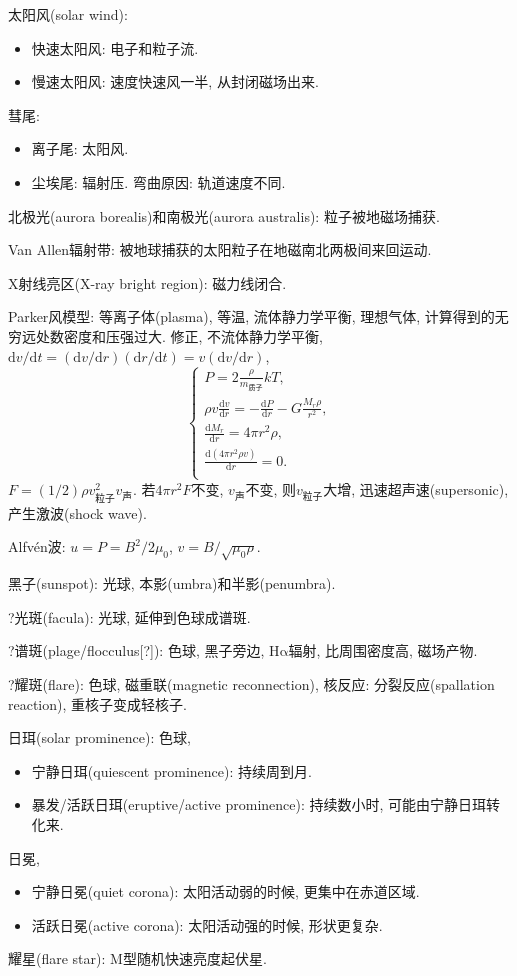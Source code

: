 太阳风(solar wind):
\begin{itemize}
    \item 快速太阳风: 电子和粒子流.
    \item 慢速太阳风: 速度快速风一半, 从封闭磁场出来.
\end{itemize}

彗尾:
\begin{itemize}
    \item 离子尾: 太阳风.
    \item 尘埃尾: 辐射压. 弯曲原因: 轨道速度不同.
\end{itemize}

北极光(aurora borealis)和南极光(aurora australis): 粒子被地磁场捕获.

Van Allen辐射带: 被地球捕获的太阳粒子在地磁南北两极间来回运动.

X射线亮区(X-ray bright region): 磁力线闭合.

Parker风模型: 等离子体(plasma), 等温, 流体静力学平衡, 理想气体, 计算得到的无穷远处数密度和压强过大. 修正, 不流体静力学平衡, $\mathrm{d}v/\mathrm{d}t=(\mathrm{d}v/\mathrm{d}r)(\mathrm{d}r/\mathrm{d}t)=v(\mathrm{d}v/\mathrm{d}r)$,
\begin{equation*}
    \begin{cases}
        P = 2\frac{\rho}{m_\text{质子}}kT, \\
        \rho v \frac{\mathrm{d}v}{\mathrm{d}r}=-\frac{\mathrm{d}P}{\mathrm{d}r}-G\frac{M_r\rho}{r^2}, \\
        \frac{\mathrm{d}M_r}{\mathrm{d}r}=4\pi r^2\rho, \\
        \frac{\mathrm{d}(4\pi r^2\rho v)}{\mathrm{d}r}=0. \\
    \end{cases}
\end{equation*}
$F=(1/2)\rho v_\text{粒子}^2v_\text{声}$. 若$4\pi r^2F$不变, $v_\text{声}$不变, 则$v_\text{粒子}$大增, 迅速超声速(supersonic), 产生激波(shock wave).

Alfv\'en波: $u=P=B^2/2\mu_0$, $v=B/\sqrt{\mu_0\rho}$.

黑子(sunspot): 光球, 本影(umbra)和半影(penumbra).

?光斑(facula): 光球, 延伸到色球成谱斑.

?谱斑(plage/flocculus[?]): 色球, 黑子旁边, H$\mathrm{\alpha}$辐射, 比周围密度高, 磁场产物.

?耀斑(flare): 色球, 磁重联(magnetic reconnection), 核反应: 分裂反应(spallation reaction), 重核子变成轻核子.

日珥(solar prominence): 色球,
\begin{itemize}
    \item 宁静日珥(quiescent prominence): 持续周到月.
    \item 暴发/活跃日珥(eruptive/active prominence): 持续数小时, 可能由宁静日珥转化来.
\end{itemize}

日冕,
\begin{itemize}
    \item 宁静日冕(quiet corona): 太阳活动弱的时候, 更集中在赤道区域.
    \item 活跃日冕(active corona): 太阳活动强的时候, 形状更复杂.
\end{itemize}

耀星(flare star): M型随机快速亮度起伏星.

